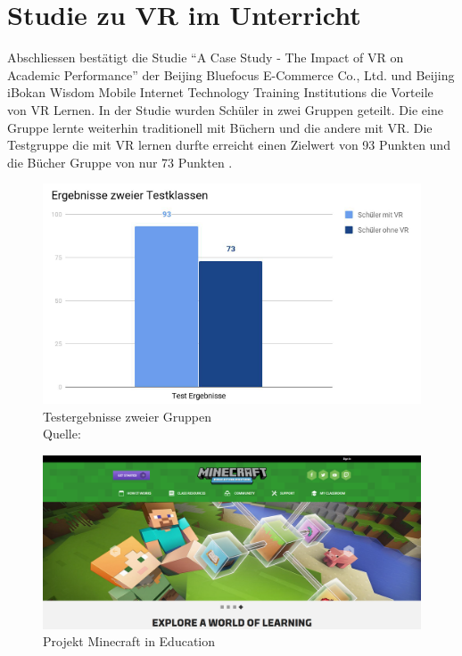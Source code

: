 \section{Studie zu VR im Unterricht}
Abschliessen bestätigt die Studie “A Case Study - The Impact of VR on Academic Performance” der Beijing Bluefocus E-Commerce Co., Ltd. und Beijing iBokan Wisdom Mobile Internet Technology Training Institutions die Vorteile von VR Lernen. In der Studie wurden Schüler in zwei Gruppen geteilt. Die eine Gruppe lernte weiterhin traditionell mit Büchern und die andere mit VR. Die Testgruppe die mit VR lernen durfte erreicht einen Zielwert von 93 Punkten und die Bücher Gruppe von nur 73 Punkten  \cite[vgl.][]{htcvive}.

\begin{figure}[ht]
	\centering
	\includegraphics[width=\textwidth,height=\textheight,keepaspectratio]{images/TestergebnisseGruppen.png}
	\caption{Testergebnisse zweier Gruppen \\ Quelle: \cite[vgl.][]{htcvive}}
	\label{Testergebnisse zweier Gruppen}
\end{figure}

\begin{figure}[ht]
	\centering
	\includegraphics[width=\textwidth,height=\textheight,keepaspectratio]{images/Minecraft.png}
	\caption{Projekt Minecraft in Education \cite{HomepageMinecraftEducation}}
	\label{projectMinecraft}
\end{figure}


